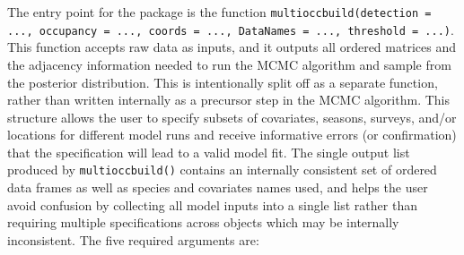The entry point for the package is the function \texttt{multioccbuild(detection = ..., occupancy = ..., coords = ..., DataNames = ..., threshold = ...)}.  This function accepts raw data as inputs, and it outputs all ordered matrices and the adjacency information needed to run the MCMC algorithm and sample from the posterior distribution.  This is intentionally split off as a separate function, rather than written internally as a precursor step in the MCMC algorithm.  This structure allows the user to specify subsets of covariates, seasons, surveys, and/or locations for different model runs and receive informative errors (or confirmation) that the specification will lead to a valid model fit.  The single output list produced by \texttt{multioccbuild()} contains an internally consistent set of ordered data frames as well as species and covariates names used, and helps the user avoid confusion by collecting all model inputs into a single list rather than requiring multiple specifications across objects which may be internally inconsistent.  The five required arguments are:
